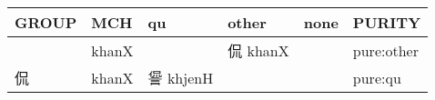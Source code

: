 \documentclass[14pt,a4paper]{scrartcl}
\begin{document}
\begin{longtable}[c]{@{}llllll@{}}
\toprule
\begin{minipage}[b]{0.14\columnwidth}\raggedright\strut
GROUP
\strut\end{minipage} &
\begin{minipage}[b]{0.14\columnwidth}\raggedright\strut
MCH
\strut\end{minipage} &
\begin{minipage}[b]{0.14\columnwidth}\raggedright\strut
qu
\strut\end{minipage} &
\begin{minipage}[b]{0.14\columnwidth}\raggedright\strut
other
\strut\end{minipage} &
\begin{minipage}[b]{0.14\columnwidth}\raggedright\strut
none
\strut\end{minipage} &
\begin{minipage}[b]{0.14\columnwidth}\raggedright\strut
PURITY
\strut\end{minipage}\tabularnewline
\midrule
\endhead
\begin{minipage}[t]{0.14\columnwidth}\raggedright\strut
𠈉
\strut\end{minipage} &
\begin{minipage}[t]{0.14\columnwidth}\raggedright\strut
khanX
\strut\end{minipage} &
\begin{minipage}[t]{0.14\columnwidth}\raggedright\strut
\strut\end{minipage} &
\begin{minipage}[t]{0.14\columnwidth}\raggedright\strut
侃 khanX
\strut\end{minipage} &
\begin{minipage}[t]{0.14\columnwidth}\raggedright\strut
\strut\end{minipage} &
\begin{minipage}[t]{0.14\columnwidth}\raggedright\strut
pure:other
\strut\end{minipage}\tabularnewline
\begin{minipage}[t]{0.14\columnwidth}\raggedright\strut
侃
\strut\end{minipage} &
\begin{minipage}[t]{0.14\columnwidth}\raggedright\strut
khanX
\strut\end{minipage} &
\begin{minipage}[t]{0.14\columnwidth}\raggedright\strut
諐 khjenH
\strut\end{minipage} &
\begin{minipage}[t]{0.14\columnwidth}\raggedright\strut
\strut\end{minipage} &
\begin{minipage}[t]{0.14\columnwidth}\raggedright\strut
\strut\end{minipage} &
\begin{minipage}[t]{0.14\columnwidth}\raggedright\strut
pure:qu
\strut\end{minipage}\tabularnewline
\bottomrule
\end{longtable}
\end{document}

